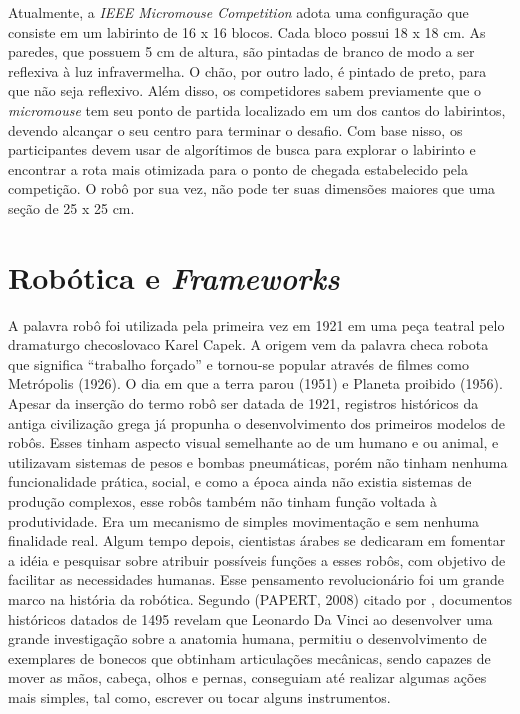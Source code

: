\hspace{0.5cm} Atualmente, a \textit{IEEE Micromouse Competition} adota uma configuração que consiste em um labirinto de 16 x 16 blocos. Cada bloco possui 18 x 18 cm. As paredes, que possuem 5 cm de altura, são pintadas de branco de modo a ser reflexiva à luz infravermelha. O chão, por outro lado, é pintado de preto, para que não seja reflexivo. Além disso, os competidores sabem previamente que o \textit{micromouse} tem seu ponto de partida localizado em um dos cantos do labirintos, devendo alcançar o seu centro para terminar o desafio. Com base nisso, os participantes devem usar de algorítimos de busca para explorar o labirinto e encontrar a rota mais otimizada para o ponto de chegada estabelecido pela competição. O robô por sua vez, não pode ter suas dimensões maiores que uma seção de 25 x 25 cm. 

\section{Robótica e \textit{Frameworks}}
\label{sec:robotic_frameworks}
A palavra robô foi utilizada pela primeira vez em 1921 em uma peça teatral pelo dramaturgo checoslovaco Karel Capek. A origem vem da palavra checa robota que significa “trabalho forçado” e tornou-se popular através de filmes como Metrópolis (1926). O dia em que a terra parou (1951) e Planeta proibido (1956). Apesar da inserção do termo robô ser datada de 1921, registros históricos da antiga civilização grega já propunha o desenvolvimento dos primeiros modelos de robôs. Esses tinham aspecto visual semelhante ao de um humano e ou animal, e utilizavam sistemas de pesos e bombas pneumáticas, porém não tinham nenhuma funcionalidade prática, social, e como a época ainda não existia sistemas de produção complexos, esse robôs também não tinham função voltada à produtividade. Era um mecanismo de simples movimentação e sem nenhuma finalidade real. Algum tempo depois, cientistas árabes se dedicaram em fomentar a idéia e pesquisar sobre atribuir possíveis funções a esses robôs, com objetivo de facilitar as necessidades humanas. Esse pensamento revolucionário foi um grande marco na história da robótica. Segundo (PAPERT, 2008) citado por , documentos históricos datados de 1495 revelam que Leonardo Da Vinci ao desenvolver uma grande investigação sobre a anatomia humana, permitiu o desenvolvimento de exemplares de bonecos que obtinham articulações mecânicas, sendo capazes de mover as mãos, cabeça, olhos e pernas, conseguiam até realizar algumas ações mais simples, tal como, escrever ou tocar alguns instrumentos. 

